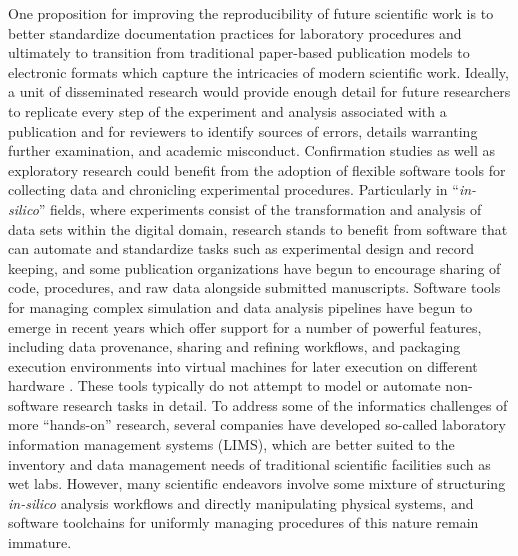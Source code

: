 One proposition for improving the
reproducibility of future scientific work is to better standardize
documentation practices for laboratory procedures
\cite{10.1371/journal.pmed.0020124} and ultimately to transition from
traditional paper-based publication models to electronic formats which
capture the intricacies of modern scientific work. Ideally, a unit of disseminated
research would provide enough detail for future researchers to replicate
every step of the experiment and analysis associated with a
publication and for reviewers to identify sources of errors, details
warranting further examination, and
academic misconduct. Confirmation studies as well as exploratory
research could benefit from the adoption of flexible
software tools for collecting data and chronicling experimental
procedures. Particularly in ``\textit{in-silico}'' fields, where
experiments consist of the transformation and analysis of data sets
within the digital domain, research stands to benefit from
software that can automate and standardize tasks such as
experimental design and record keeping, and some publication
organizations have begun to encourage sharing of code, procedures, and
raw data alongside submitted manuscripts.
Software tools for managing complex simulation and data analysis
pipelines have begun to emerge in recent years which offer support for a number of powerful features,
including data provenance, sharing and refining workflows, and
packaging execution environments into virtual machines for
later execution on different hardware \cite{VisTrails, Taverna}.
These tools typically do not attempt to model or automate non-software
research tasks in detail.
To address some of the informatics challenges of more ``hands-on''
research, several companies have developed
so-called laboratory information management systems (LIMS), which are
better suited to the inventory and data management needs of
traditional scientific facilities such as wet labs.
However, many scientific endeavors involve some mixture of
structuring \textit{in-silico} analysis workflows and directly
manipulating physical systems, and software toolchains for uniformly
managing procedures of this nature remain immature.

